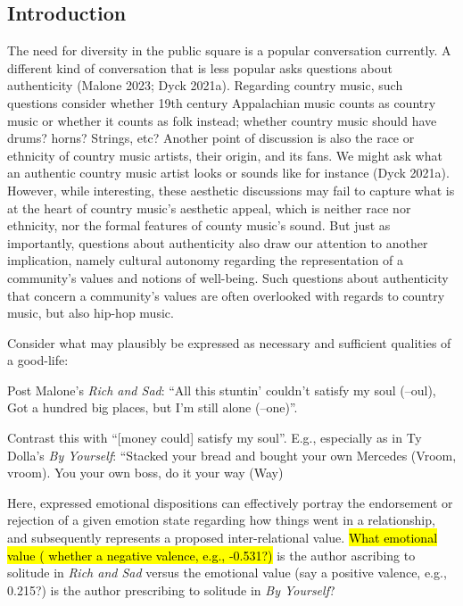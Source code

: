 \documentclass[
  letterpaper,
  DIV=11,
  numbers=noendperiod]{scrartcl}
\theoremstyle{remark}
\begin{document}
\subsection{Introduction}\label{introduction}

The need for diversity in the public square is a popular conversation
currently. A different kind of conversation that is less popular asks
questions about authenticity (Malone 2023; Dyck 2021a). Regarding
country music, such questions consider whether 19th century Appalachian
music counts as country music or whether it counts as folk instead;
whether country music should have drums? horns? Strings, etc? Another
point of discussion is also the race or ethnicity of country music
artists, their origin, and its fans. We might ask what an authentic
country music artist looks or sounds like for instance (Dyck 2021a).
However, while interesting, these aesthetic discussions may fail to
capture what is at the heart of country music's aesthetic appeal, which
is neither race nor ethnicity, nor the formal features of county music's
sound. But just as importantly, questions about authenticity also draw
our attention to another implication, namely cultural autonomy regarding
the representation of a community's values and notions of well-being.
Such questions about authenticity that concern a community's values are
often overlooked with regards to country music, but also hip-hop music.

Consider what may plausibly be expressed as necessary and sufficient
qualities of a good-life:

Post Malone's \emph{Rich and Sad}: ``All this stuntin' couldn't satisfy
my soul (--oul), Got a hundred big places, but I'm still alone
(--one)''.

Contrast this with ``{[}money could{]} satisfy my soul''. E.g.,
especially as in Ty Dolla's \emph{By Yourself}: ``Stacked your bread and
bought your own Mercedes (Vroom, vroom). You your own boss, do it your
way (Way)

Here, expressed emotional dispositions can effectively portray the
endorsement or rejection of a given emotion state regarding how things
went in a relationship, and subsequently represents a proposed
inter-relational value. \hl{What emotional value ( whether a negative
valence, e.g., -0.531?)} is the author ascribing to solitude in
\emph{Rich and Sad} versus the emotional value (say a positive valence,
e.g., 0.215?) is the author prescribing to solitude in \emph{By
Yourself}?
\end{document}
